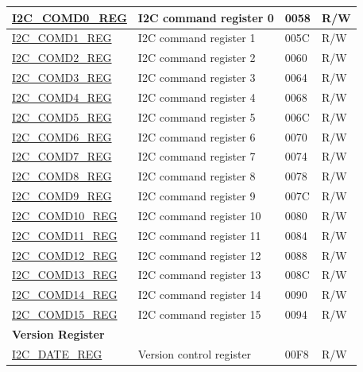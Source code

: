 \begin{longtable}{ | p{6cm} | p{7.2cm} | p{1.3cm} | p{1cm} | }
\hyperref[regdesc:I2CCOMD0REG]{I2C\_COMD0\_REG} & I2C command register 0 & \hexprefix{}0058 & R/W \\ \hline
\hyperref[regdesc:I2CCOMD1REG]{I2C\_COMD1\_REG} & I2C command register 1 & \hexprefix{}005C & R/W \\ \hline
\hyperref[regdesc:I2CCOMD2REG]{I2C\_COMD2\_REG} & I2C command register 2 & \hexprefix{}0060 & R/W \\ \hline
\hyperref[regdesc:I2CCOMD3REG]{I2C\_COMD3\_REG} & I2C command register 3 & \hexprefix{}0064 & R/W \\ \hline
\hyperref[regdesc:I2CCOMD4REG]{I2C\_COMD4\_REG} & I2C command register 4 & \hexprefix{}0068 & R/W \\ \hline
\hyperref[regdesc:I2CCOMD5REG]{I2C\_COMD5\_REG} & I2C command register 5 & \hexprefix{}006C & R/W \\ \hline
\hyperref[regdesc:I2CCOMD6REG]{I2C\_COMD6\_REG} & I2C command register 6 & \hexprefix{}0070 & R/W \\ \hline
\hyperref[regdesc:I2CCOMD7REG]{I2C\_COMD7\_REG} & I2C command register 7 & \hexprefix{}0074 & R/W \\ \hline
\hyperref[regdesc:I2CCOMD8REG]{I2C\_COMD8\_REG} & I2C command register 8 & \hexprefix{}0078 & R/W \\ \hline
\hyperref[regdesc:I2CCOMD9REG]{I2C\_COMD9\_REG} & I2C command register 9 & \hexprefix{}007C & R/W \\ \hline
\hyperref[regdesc:I2CCOMD10REG]{I2C\_COMD10\_REG} & I2C command register 10 & \hexprefix{}0080 & R/W \\ \hline
\hyperref[regdesc:I2CCOMD11REG]{I2C\_COMD11\_REG} & I2C command register 11 & \hexprefix{}0084 & R/W \\ \hline
\hyperref[regdesc:I2CCOMD12REG]{I2C\_COMD12\_REG} & I2C command register 12 & \hexprefix{}0088 & R/W \\ \hline
\hyperref[regdesc:I2CCOMD13REG]{I2C\_COMD13\_REG} & I2C command register 13 & \hexprefix{}008C & R/W \\ \hline
\hyperref[regdesc:I2CCOMD14REG]{I2C\_COMD14\_REG} & I2C command register 14 & \hexprefix{}0090 & R/W \\ \hline
\hyperref[regdesc:I2CCOMD15REG]{I2C\_COMD15\_REG} & I2C command register 15 & \hexprefix{}0094 & R/W \\ \hline
\multicolumn{4}{|l|}{\textbf{Version Register}} \\ \hline
\hyperref[regdesc:I2CDATEREG]{I2C\_DATE\_REG} & Version control register & \hexprefix{}00F8 & R/W \\ \hline
\end{longtable}
